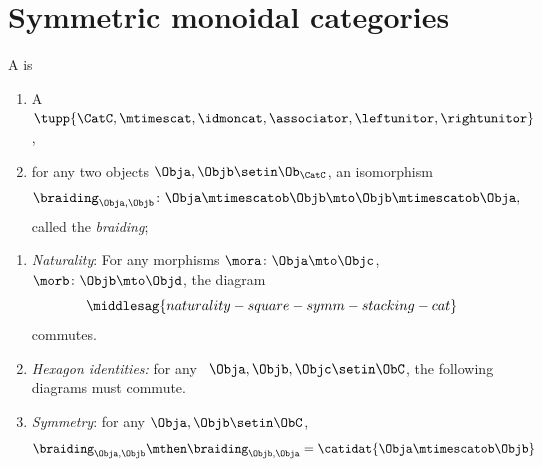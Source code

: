 
\section{Symmetric monoidal categories}

\begin{ctdefinition}
    \label{def:symmetric-monoidal-category}
    A  is

    \constit
    \begin{enumerate}
        \item A ~$\tupp{\CatC, \mtimescat, \idmoncat, \associator, \leftunitor, \rightunitor}$,
        \item for any two objects $\Obja, \Objb \setin \Ob_\CatC$, an isomorphism
              \begin{equation}
                  \braiding_{\Obja, \Objb} \colon \Obja \mtimescatob \Objb \mto \Objb \mtimescatob \Obja,
              \end{equation}
              called the \emph{braiding};
    \end{enumerate}

    \condit

    \begin{enumerate}
        \item \emph{Naturality}: For any morphisms $\mora \colon \Obja \mto \Objc$, $\morb \colon \Objb \mto \Objd$, the diagram
              \begin{equation}\label{eq:naturality-square-symm-stacking-cat-again}
                  \middlesag{naturality-square-symm-stacking-cat}
              \end{equation}
              commutes.
        \item \emph{Hexagon identities:}
              for any ~$\Obja,\Objb,\Objc\setin \ObC$, the following diagrams must commute.
        \item \emph{Symmetry}: for any $\Obja, \Objb \setin \ObC$,
              \begin{equation}
                  \label{eq:braiding-symmetry}
                  \braiding_{\Obja,\Objb} \mthen \braiding_{\Objb,\Obja} = \catidat{\Obja \mtimescatob \Objb}
              \end{equation}
    \end{enumerate}

\end{ctdefinition}

